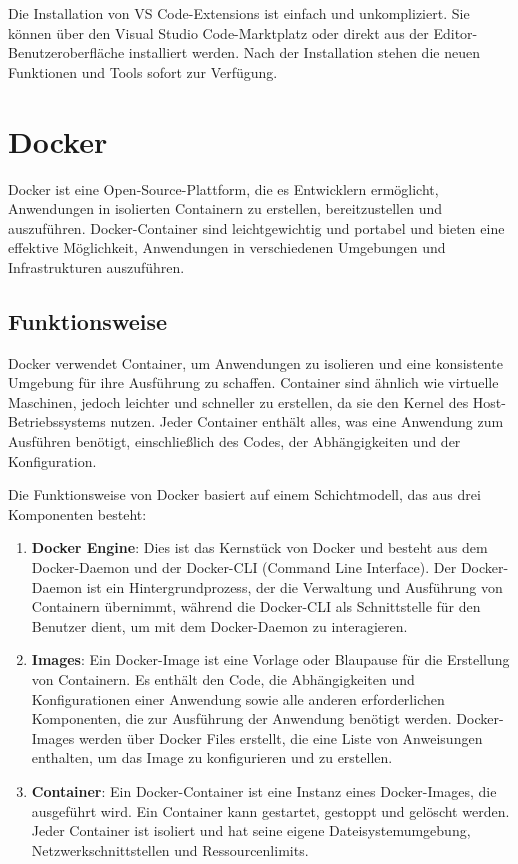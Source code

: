 Die Installation von VS Code-Extensions ist einfach und unkompliziert. Sie können über den Visual Studio Code-Marktplatz oder direkt aus der Editor-Benutzeroberfläche installiert werden.
Nach der Installation stehen die neuen Funktionen und Tools sofort zur Verfügung.
\pagebreak
\section{Docker}
Docker ist eine Open-Source-Plattform, die es Entwicklern ermöglicht, Anwendungen in isolierten Containern zu erstellen, bereitzustellen und auszuführen. 
Docker-Container sind leichtgewichtig und portabel und bieten eine effektive Möglichkeit, Anwendungen in verschiedenen Umgebungen und Infrastrukturen auszuführen.

\subsection{Funktionsweise}
Docker verwendet Container, um Anwendungen zu isolieren und eine konsistente Umgebung für ihre Ausführung zu schaffen. Container sind ähnlich wie virtuelle Maschinen, 
jedoch leichter und schneller zu erstellen, da sie den Kernel des Host-Betriebssystems nutzen. Jeder Container enthält alles, was eine Anwendung zum Ausführen benötigt, 
einschließlich des Codes, der Abhängigkeiten und der Konfiguration.

Die Funktionsweise von Docker basiert auf einem Schichtmodell, das aus drei Komponenten besteht:

\begin{enumerate}
    \item \textbf{Docker Engine}: Dies ist das Kernstück von Docker und besteht aus dem Docker-Daemon und der Docker-CLI (Command Line Interface). Der Docker-Daemon ist ein Hintergrundprozess, 
    der die Verwaltung und Ausführung von Containern übernimmt, während die Docker-CLI als Schnittstelle für den Benutzer dient, um mit dem Docker-Daemon zu interagieren.
    \item \textbf{Images}: Ein Docker-Image ist eine Vorlage oder Blaupause für die Erstellung von Containern. 
    Es enthält den Code, die Abhängigkeiten und Konfigurationen einer Anwendung sowie alle anderen erforderlichen Komponenten, die zur Ausführung der Anwendung benötigt werden. 
    Docker-Images werden über Docker Files erstellt, die eine Liste von Anweisungen enthalten, um das Image zu konfigurieren und zu erstellen.
    \item \textbf{Container}: Ein Docker-Container ist eine Instanz eines Docker-Images, die ausgeführt wird. Ein Container kann gestartet, gestoppt und gelöscht werden. 
    Jeder Container ist isoliert und hat seine eigene Dateisystemumgebung, Netzwerkschnittstellen und Ressourcenlimits.
    \end{enumerate}

